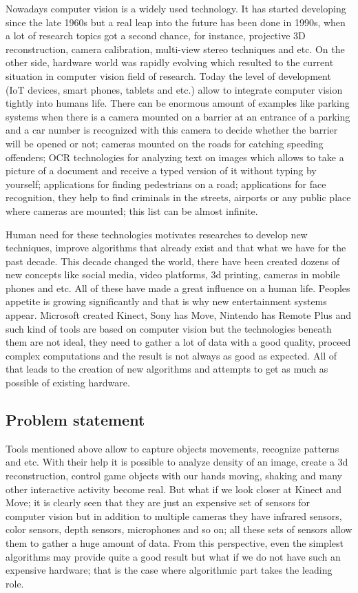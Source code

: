 \documentclass[../main]{subfiles}
\begin{document}
Nowadays computer vision is a widely used technology. It has started developing since the late 1960s but a real leap into the future has been done in 1990s, when a lot of research topics got a second chance, for instance, projective 3D reconstruction, camera calibration, multi-view stereo techniques and etc. On the other side, hardware world was rapidly evolving which resulted to the current situation in computer vision field of research. Today the level of development (IoT devices, smart phones, tablets and etc.) allow to integrate computer vision tightly into humans life. There can be enormous amount of examples like parking systems when there is a camera mounted on a barrier at an entrance of a parking and a car number is recognized with this camera to decide whether the barrier will be opened or not; cameras mounted on the roads for catching speeding offenders; OCR technologies for analyzing text on images which allows to take a picture of a document and receive a typed version of it without typing by yourself; applications for finding pedestrians on a road; applications for face recognition, they help to find criminals in the streets, airports or any public place where cameras are mounted; this list can be almost infinite.

Human need for these technologies motivates researches to develop new techniques, improve algorithms that already exist and that what we have for the past decade. This decade changed the world, there have been created dozens of new concepts like social media, video platforms, 3d printing, cameras in mobile phones and etc. All of these have made a great influence on a human life. Peoples appetite is growing significantly and that is why new entertainment systems appear. Microsoft created Kinect, Sony has Move, Nintendo has Remote Plus and such kind of tools are based on computer vision but the technologies beneath them are not ideal, they need to gather a lot of data with a good quality, proceed complex computations and the result is not always as good as expected. All of that leads to the creation of new algorithms and attempts to get as much as possible of existing hardware. 

\subsection{Problem statement}

Tools mentioned above allow to capture objects movements, recognize patterns and etc. With their help it is possible to analyze density of an image, create a 3d reconstruction, control game objects with our hands moving, shaking and many other interactive activity become real. But what if we look closer at Kinect and Move; it is clearly seen that they are just an expensive set of sensors for computer vision but in addition to multiple cameras they have infrared sensors, color sensors, depth sensors, microphones and so on; all these sets of sensors allow them to gather a huge amount of data. From this perspective, even the simplest algorithms may provide quite a good result but what if we do not have such an expensive hardware; that is the case where algorithmic part takes the leading role.
\end{document}
